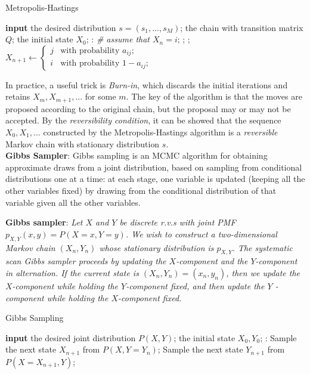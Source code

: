 \documentclass{progartcn}
\begin{document}
    	\begin{algorithm}[H]
		\caption{Metropolis-Hastings}
		\label{alg: Metropolis-Hastings}
		\begin{algorithmic}[1]
			\State \textbf{input} the desired distribution $s=(s_1,...,s_M)$; the chain with transition matrix $Q$; the initial state $X_0$;
			: \textit{ \# assume that $X_n=i$};
				;
				;
				\State $X_{n+1}\gets\begin{cases}j & \text{with probability }a_{ij};\\i & \text{with probability }1-a_{ij};\end{cases}$
        	\EndFor
		\end{algorithmic}
		\end{algorithm}

		In practice, a useful trick is \textit{Burn-in}, which discards the initial iterations and retains $X_m,X_{m+1},...$ for some $m$. The key of the algorithm is that the moves are proposed according to the original chain, but the proposal may or may not be accepted. By the \textit{reversibility condition}, it can be showed that the sequence $X_0,X_1,...$ constructed by the Metropolis-Hastings algorithm is a \textit{reversible} Markov chain with stationary distribution $s$.\\

		\textbf{Gibbs Sampler}: Gibbs sampling is an MCMC algorithm for obtaining approximate draws from a joint distribution, based on sampling from conditional distributions one at a time: at each stage, one variable is updated (keeping all the other variables fixed) by drawing from the conditional distribution of that variable given all the other variables.

		\textbf{Gibbs sampler}: \textit{Let $X$ and $Y$ be discrete r.v.s with joint PMF $p_{X,Y} (x,y) = P(X = x,Y = y)$. We wish to construct a two-dimensional Markov chain $(X_n, Y_n)$ whose stationary distribution is $p_{X,Y}$. The systematic scan Gibbs sampler proceeds by updating the $X$-component and the $Y$-component in alternation. If the current state is $(X_n,Y_n) = (x_n,y_n)$, then we update the $X$-component while holding the $Y$-component fixed, and then update the $Y$ -component while holding the $X$-component fixed.}

		\begin{algorithm}[H]
		\caption{Gibbs Sampling}
		\label{alg: Gibbs Sampling}
		\begin{algorithmic}[1]
			\State \textbf{input} the desired joint distribution $P(X,Y)$; the initial state $X_0, Y_0$;
			:
				\State Sample the next state $X_{n+1}$ from $P(X, Y=Y_n)$;
            	\State Sample the next state $Y_{n+1}$ from $P(X=X_{n+1}, Y)$;
        	\EndFor
		\end{algorithmic}
		\end{algorithm}
\end{document}
